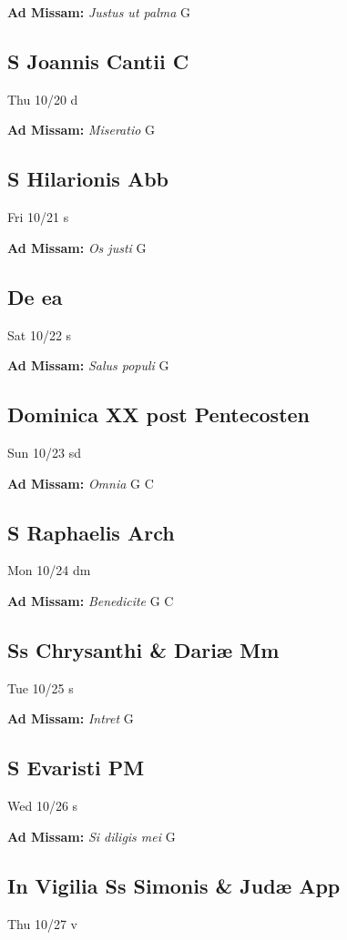 \documentclass[letterpaper, 10pt, twocolumn]{article}
\begin{document}
\textbf{Ad Missam:} \textit{Justus ut palma} G 

\subsection*{S Joannis Cantii C}Thu 10/20 d

\textbf{Ad Missam:} \textit{Miseratio} G 

\subsection*{S Hilarionis Abb}Fri 10/21 s

\textbf{Ad Missam:} \textit{Os justi} G 

\subsection*{De ea}Sat 10/22 s

\textbf{Ad Missam:} \textit{Salus populi} G 

\subsection*{Dominica XX post Pentecosten}Sun 10/23 sd

\textbf{Ad Missam:} \textit{Omnia} G C 

\subsection*{S Raphaelis Arch}Mon 10/24 dm

\textbf{Ad Missam:} \textit{Benedicite} G C 

\subsection*{Ss Chrysanthi \& Dariæ Mm}Tue 10/25 s

\textbf{Ad Missam:} \textit{Intret} G 

\subsection*{S Evaristi PM}Wed 10/26 s

\textbf{Ad Missam:} \textit{Si diligis mei} G 

\subsection*{In Vigilia Ss Simonis \& Judæ App}Thu 10/27 v
\end{document}
